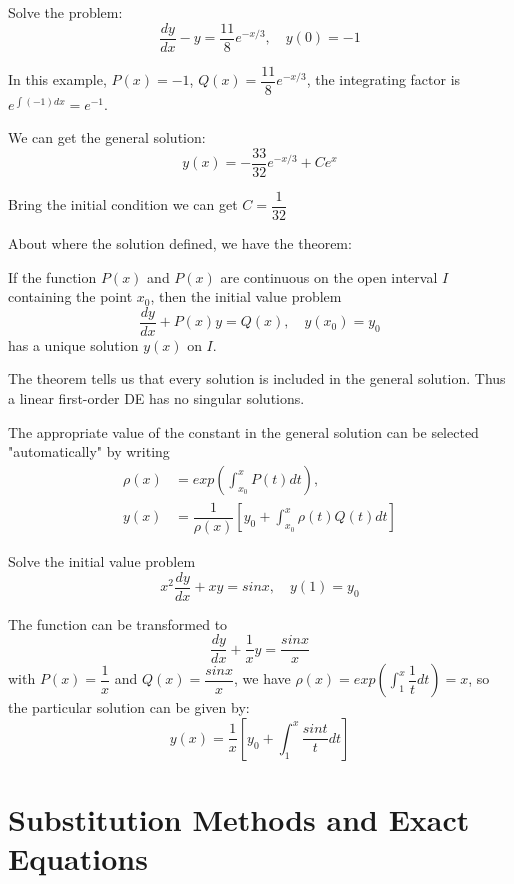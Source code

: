 \begin{example}
    Solve the problem:
    \[
        \dfrac{dy}{dx} - y = \dfrac{11}{8} e^{-x/3}, \quad y(0) = -1
    \]

    In this example, \(P(x) = -1\), \(Q(x) = \dfrac{11}{8}e^{-x/3}\), the integrating factor is \(e^{\int (-1) dx} = e^{-1}\). 

    We can get the general solution:
    \[
        y(x) = -\dfrac{33}{32}e^{-x/3} + Ce^x
    \]

    Bring the initial condition we can get \(C = \dfrac{1}{32}\) 
\end{example}

About where the solution defined, we have the theorem:
\begin{theorem}
    If the function \(P(x)\) and \(P(x)\) are continuous on the open interval \(I\) containing the point \(x_0\), then the initial value problem
    \[
        \dfrac{dy}{dx} + P(x)y = Q(x), \quad y(x_0) = y_0
    \]   
    has a unique solution \(y(x)\) on \(I\).
\end{theorem}
\begin{remark}
    The theorem tells us that every solution is included in the general solution. Thus a linear first-order DE has no singular solutions.
\end{remark}
\begin{remark}
    The appropriate value of the constant in the general solution can be selected "automatically" by writing
    \begin{align*}
        \rho(x) &= exp(\int_{x_0}^x P(t) dt),\\
        y(x) &= \dfrac{1}{\rho(x)} [y_0 + \int_{x_0}^x \rho(t) Q(t) dt]
    \end{align*}
\end{remark}


\begin{example}
    Solve the initial value problem
    \[
        x^2 \dfrac{dy}{dx} + xy= sin x, \quad y(1) = y_0
    \] 

    The function can be transformed to
    \[
        \dfrac{dy}{dx} + \dfrac{1}{x}y = \dfrac{sin x}{x}
    \]
    with \(P(x) = \dfrac{1}{x}\) and \(Q(x) = \dfrac{sin x}{x}\), we have \(\rho(x) = exp(\int_1^x \dfrac{1}{t}dt) = x\),
    so the particular solution can be given by:
    \[
        y(x) = \dfrac{1}{x} [y_0 + \int_1^x \dfrac{sin t}{t}dt]
    \]
\end{example}

\section{Substitution Methods and Exact Equations}